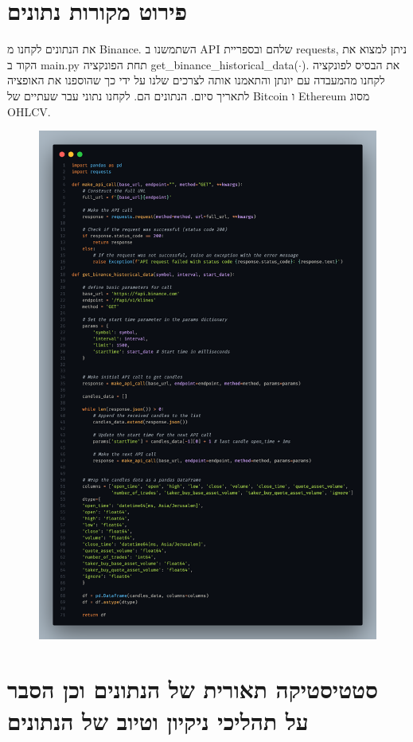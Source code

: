 \documentclass[a4paper,11pt]{article}
\newcommand{\te}[1]{\textenglish{#1}}
\begin{document}
\begin{RTL}
\section{פירוט מקורות נתונים}
את הנתונים לקחנו מ \te{Binance}. השתמשנו ב \te{API} שלהם ובספריית \te{requests}, ניתן למצוא את הקוד ב \te{main.py} תחת הפונקציה \te{get\_binance\_historical\_data($\cdot$)}. את הבסיס לפונקציה לקחנו מהמעבדה עם יונתן והתאמנו אותה לצרכים שלנו על ידי כך שהוספנו את האופציה לתאריך סיום. הנתונים הם. לקחנו נתוני עבר שעתיים של \te{Bitcoin} ו \te{Ethereum} מסוג \te{OHLCV}.
\begin{figure}[H]
    \centering
    \includegraphics[width=.75\textwidth]{Data.png}
\end{figure}
\newpage
\section{סטטיסטיקה תאורית של הנתונים וכן הסבר על תהליכי ניקיון וטיוב של הנתונים}

\end{RTL}
\end{document}
